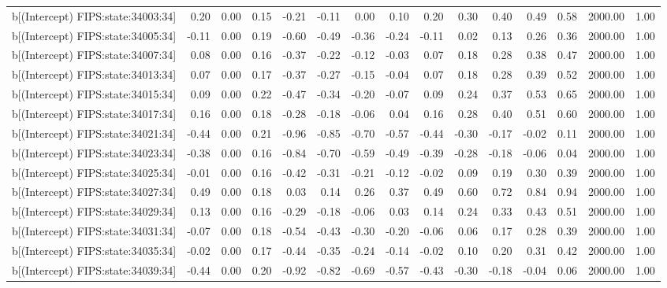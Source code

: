 \begin{table}[ht]
\begin{tabular}{rrrrrrrrrrrrrrr}
  b[(Intercept) FIPS:state:34003:34] & 0.20 & 0.00 & 0.15 & -0.21 & -0.11 & 0.00 & 0.10 & 0.20 & 0.30 & 0.40 & 0.49 & 0.58 & 2000.00 & 1.00 \\ 
  b[(Intercept) FIPS:state:34005:34] & -0.11 & 0.00 & 0.19 & -0.60 & -0.49 & -0.36 & -0.24 & -0.11 & 0.02 & 0.13 & 0.26 & 0.36 & 2000.00 & 1.00 \\ 
  b[(Intercept) FIPS:state:34007:34] & 0.08 & 0.00 & 0.16 & -0.37 & -0.22 & -0.12 & -0.03 & 0.07 & 0.18 & 0.28 & 0.38 & 0.47 & 2000.00 & 1.00 \\ 
  b[(Intercept) FIPS:state:34013:34] & 0.07 & 0.00 & 0.17 & -0.37 & -0.27 & -0.15 & -0.04 & 0.07 & 0.18 & 0.28 & 0.39 & 0.52 & 2000.00 & 1.00 \\ 
  b[(Intercept) FIPS:state:34015:34] & 0.09 & 0.00 & 0.22 & -0.47 & -0.34 & -0.20 & -0.07 & 0.09 & 0.24 & 0.37 & 0.53 & 0.65 & 2000.00 & 1.00 \\ 
  b[(Intercept) FIPS:state:34017:34] & 0.16 & 0.00 & 0.18 & -0.28 & -0.18 & -0.06 & 0.04 & 0.16 & 0.28 & 0.40 & 0.51 & 0.60 & 2000.00 & 1.00 \\ 
  b[(Intercept) FIPS:state:34021:34] & -0.44 & 0.00 & 0.21 & -0.96 & -0.85 & -0.70 & -0.57 & -0.44 & -0.30 & -0.17 & -0.02 & 0.11 & 2000.00 & 1.00 \\ 
  b[(Intercept) FIPS:state:34023:34] & -0.38 & 0.00 & 0.16 & -0.84 & -0.70 & -0.59 & -0.49 & -0.39 & -0.28 & -0.18 & -0.06 & 0.04 & 2000.00 & 1.00 \\ 
  b[(Intercept) FIPS:state:34025:34] & -0.01 & 0.00 & 0.16 & -0.42 & -0.31 & -0.21 & -0.12 & -0.02 & 0.09 & 0.19 & 0.30 & 0.39 & 2000.00 & 1.00 \\ 
  b[(Intercept) FIPS:state:34027:34] & 0.49 & 0.00 & 0.18 & 0.03 & 0.14 & 0.26 & 0.37 & 0.49 & 0.60 & 0.72 & 0.84 & 0.94 & 2000.00 & 1.00 \\ 
  b[(Intercept) FIPS:state:34029:34] & 0.13 & 0.00 & 0.16 & -0.29 & -0.18 & -0.06 & 0.03 & 0.14 & 0.24 & 0.33 & 0.43 & 0.51 & 2000.00 & 1.00 \\ 
  b[(Intercept) FIPS:state:34031:34] & -0.07 & 0.00 & 0.18 & -0.54 & -0.43 & -0.30 & -0.20 & -0.06 & 0.06 & 0.17 & 0.28 & 0.39 & 2000.00 & 1.00 \\ 
  b[(Intercept) FIPS:state:34035:34] & -0.02 & 0.00 & 0.17 & -0.44 & -0.35 & -0.24 & -0.14 & -0.02 & 0.10 & 0.20 & 0.31 & 0.42 & 2000.00 & 1.00 \\ 
  b[(Intercept) FIPS:state:34039:34] & -0.44 & 0.00 & 0.20 & -0.92 & -0.82 & -0.69 & -0.57 & -0.43 & -0.30 & -0.18 & -0.04 & 0.06 & 2000.00 & 1.00 \\ 

\end{tabular}
\end{table}
